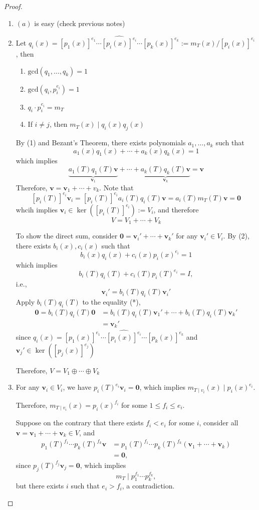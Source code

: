 \begin{proof}
\begin{enumerate}
\item
$(a)$ is easy (check previous notes)
\item
Let $q_i(x)=[p_1(x)]^{e_1}\cdots\widehat{[p_i(x)]^{e_i}}\cdots[p_k(x)]^{e_k}:=m_T(x)/[p_i(x)]^{e_i}$, then
\begin{enumerate}
\item
$\text{gcd}(q_1,\dots,q_k)=1$
\item
$\text{gcd}(q_i,p_i^{e_i})=1$
\item
$q_i\cdot p_i^{e_i}=m_T$
\item
If $i\ne j$, then $m_T(x)\mid q_i(x)q_j(x)$
\end{enumerate}
By (1) and Bezant's Theorem, there exists polynomials $a_1,\dots,a_k$ such that
\[
a_1(x)q_1(x)+\cdots+a_k(x)q_k(x)=1
\]
which implies
\[
\underbrace{a_1(T)q_1(T)\bm v}_{\bm v_1}+\cdots+\underbrace{a_k(T)q_k(T)\bm v}_{\bm v_k}=\bm v
\]
Therefore, $\bm v=\bm v_1+\cdots+v_k$.
Note that
\[
[p_i(T)]^{e_i}\bm v_i
=
[p_i(T)]^{e_i}a_i(T)q_i(T)\bm v
=a_i(T)m_T(T)\bm v=\bm0
\]
whcih implies $\bm v_i\in\ker([p_i(T)]^{e_i}):=V_i$, and therefore
\[
V=V_1+\cdots+V_k
\]

To show the direct sum, consider $\bm0=\bm v_i'+\cdots+\bm v_k'$ for any $\bm v_i'\in V_i$.
By (2),
there exists $b_i(x),c_i(x)$ such that
\[
b_i(x)q_i(x)+c_i(x)p_i(x)^{e_i}=1
\]
which implies
\[
b_i(T)q_i(T)+c_i(T)p_i(T)^{e_i}=I,
\]
i.e.,
\[
\bm v_i' = b_i(T)q_i(T)\bm v_i'
\]
Apply $b_i(T)q_i(T)$ to the equality (*),
\begin{align*}
\bm0=b_i(T)q_i(T)\bm0&=
b_i(T)q_i(T)\bm v_1'+\cdots+b_i(T)q_i(T)\bm v_k'\\
&=\bm v_k'
\end{align*}
since $q_i(x)=[p_1(x)]^{e_1}\cdots\widehat{[p_i(x)]^{e_i}}\cdots[p_k(x)]^{e_k}$ and $\bm v_j'\in\ker([p_j(x)]^{e_j})$

Therefore, $V = V_1\oplus \cdots\oplus V_k$

\item
For any $\bm v_i\in V_i$, we have $p_i(T)^{e_i}\bm v_i=\bm0$, which implies $m_{T\mid v_i}(x)\mid p_i(x)^{e_i}$.

Therefore, $m_{T\mid v_i}(x)=p_i(x)^{f_i}$ for some $1\le f_i\le e_i$.

Suppose on the contrary that there exists $f_i<e_i$ for some $i$, consider all $\bm v=\bm v_1+\cdots+\bm v_k\in V$, and
\begin{align*}
p_1(T)^{f_1}\cdots p_k(T)^{f_k}\bm v
&=
p_1(T)^{f_1}\cdots p_k(T)^{f_k}(\bm v_1+\cdots+\bm v_k)\\
&=\bm0,
\end{align*}
since $p_j(T)^{f_j}\bm v_j=\bm0$, which implies
\[
m_T\mid p_1^{f_1}\cdots p_k^{f_k},
\]
but there exists $i$ such that $e_i>f_i$, a contradiction.
\end{enumerate}
\end{proof}


